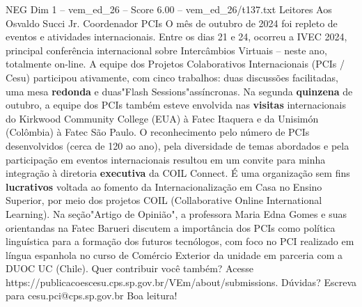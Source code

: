 \begin{textsample}{NEG Dim 1 – vem\_ed\_26 – Score 6.00 – vem\_ed\_26/t137.txt}  \label{ex:f1_neg_128}
Leitores Aos Osvaldo Succi Jr.
Coordenador PCIs O mês de outubro de 2024 foi repleto de eventos e atividades internacionais.
Entre os dias 21 e 24, ocorreu a IVEC 2024, principal conferência internacional sobre Intercâmbios Virtuais – neste ano, totalmente on-line.
A equipe dos Projetos Colaborativos Internacionais (PCIs / Cesu) participou ativamente, com cinco trabalhos: duas discussões facilitadas, uma mesa \textbf{redonda} e duas"Flash Sessions"assíncronas.
Na segunda \textbf{quinzena} de outubro, a equipe dos PCIs também esteve envolvida nas \textbf{visitas} internacionais do Kirkwood Community College (EUA) à Fatec Itaquera e da Unisimón (Colômbia) à Fatec São Paulo.
O reconhecimento pelo número de PCIs desenvolvidos (cerca de 120 ao ano), pela diversidade de temas abordados e pela participação em eventos internacionais resultou em um convite para minha integração à diretoria \textbf{executiva} da COIL Connect.
É uma organização sem fins \textbf{lucrativos} voltada ao fomento da Internacionalização em Casa no Ensino Superior, por meio dos projetos COIL (Collaborative Online International Learning).
Na seção"Artigo de Opinião", a professora Maria Edna Gomes e suas orientandas na Fatec Barueri discutem a importância dos PCIs como política linguística para a formação dos futuros tecnólogos, com foco no PCI realizado em língua espanhola no curso de Comércio Exterior da unidade em parceria com a DUOC UC (Chile).
Quer contribuir você também?
Acesse https://publicacoescesu.cps.sp.gov.br/VEm/about/submissions.
Dúvidas?
Escreva para cesu.pci@cps.sp.gov.br Boa leitura!

\end{textsample}
